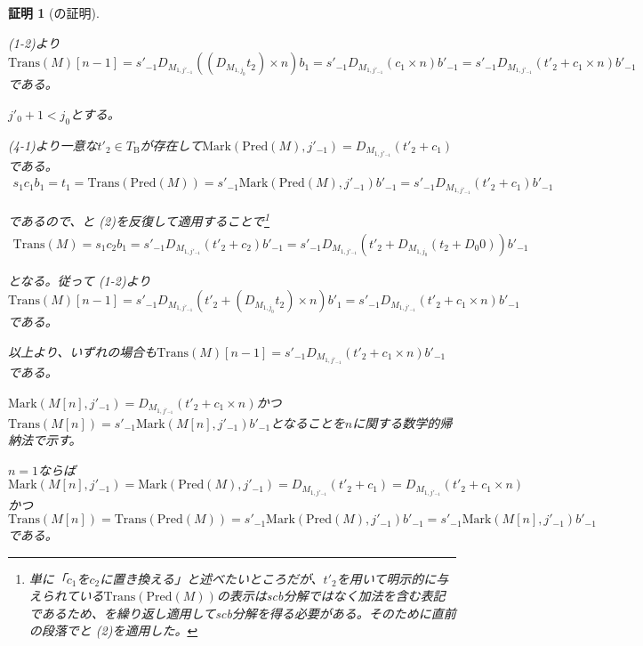 \documentclass[dvipdfmx,uplatex]{jsarticle}
\theoremstyle{customnonumberbreakfortheorem}
\theoremstyle{customnonumberbreakforproof}
\newtheorem{hideableproof}{証明}
\begin{document}
\begin{hideableproof}[の証明]
\begin{indented}
\begin{indented}
\begin{indented}
\begin{indented}
					\item {} (1-2)より\(\textrm{Trans}(M)[n-1] = s'_{-1} D_{M_{1,j'_{-1}}}((D_{M_{1,j_0}} t_2) \times n) b_1 = s'_{-1} D_{M_{1,j'_{-1}}}(c_1 \times n) b'_{-1} = s'_{-1} D_{M_{1,j'_{-1}}}(t'_2 + c_1 \times n) b'_{-1}\)である。
				\end{indented}
				\item \(j'_0+1 < j_0\)とする。
				\begin{indented}
					\item {} (4-1)より一意な\(t'_2 \in T_{\textrm{B}}\)が存在して\(\textrm{Mark}(\textrm{Pred}(M),j'_{-1}) = D_{M_{1,j'_{-1}}}(t'_2+c_1)\)である。
					\begin{eqnarray*}
					s_1 c_1 b_1 = t_1 = \textrm{Trans}(\textrm{Pred}(M)) = s'_{-1} \textrm{Mark}(\textrm{Pred}(M),j'_{-1}) b'_{-1} = s'_{-1} D_{M_{1,j'_{-1}}}(t'_2+c_1) b'_{-1}
					\end{eqnarray*}
					\item であるので、と (2)を反復して適用することで\footnote{単に「\(c_1\)を\(c_2\)に置き換える」と述べたいところだが、\(t'_2\)を用いて明示的に与えられている\(\textrm{Trans}(\textrm{Pred}(M))\)の表示はscb分解ではなく加法を含む表記であるため、を繰り返し適用してscb分解を得る必要がある。そのために直前の段落でと (2)を適用した。}
					\begin{eqnarray*}
					\textrm{Trans}(M) = s_1 c_2 b_1 = s'_{-1} D_{M_{1,j'_{-1}}}(t'_2+c_2) b'_{-1} = s'_{-1} D_{M_{1,j'_{-1}}}(t'_2 + D_{M_{1,j_0}}(t_2 + D_0 0)) b'_{-1}
					\end{eqnarray*}
					\item となる。従って (1-2)より\(\textrm{Trans}(M)[n-1] = s'_{-1} D_{M_{1,j'_{-1}}}(t'_2 + (D_{M_{1,j_0}} t_2) \times n) b'_1 = s'_{-1} D_{M_{1,j'_{-1}}}(t'_2 + c_1 \times n) b'_{-1}\)である。
				\end{indented}
				\item 以上より、いずれの場合も\(\textrm{Trans}(M)[n-1] = s'_{-1} D_{M_{1,j'_{-1}}}(t'_2 + c_1 \times n) b'_{-1}\)である。
				\item \(\textrm{Mark}(M[n],j'_{-1}) = D_{M_{1,j'_{-1}}}(t'_2 + c_1 \times n)\)かつ\(\textrm{Trans}(M[n]) = s'_{-1} \textrm{Mark}(M[n],j'_{-1}) b'_{-1}\)となることを\(n\)に関する数学的帰納法で示す。
				\item \(n = 1\)ならば\(\textrm{Mark}(M[n],j'_{-1}) = \textrm{Mark}(\textrm{Pred}(M),j'_{-1}) = D_{M_{1,j'_{-1}}}(t'_2+c_1) = D_{M_{1,j'_{-1}}}(t'_2 + c_1 \times n)\)かつ\(\textrm{Trans}(M[n]) = \textrm{Trans}(\textrm{Pred}(M)) = s'_{-1} \textrm{Mark}(\textrm{Pred}(M),j'_{-1}) b'_{-1} = s'_{-1} \textrm{Mark}(M[n],j'_{-1}) b'_{-1}\)である。

\end{indented}
\end{indented}
\end{indented}
\end{hideableproof}
\end{document}
